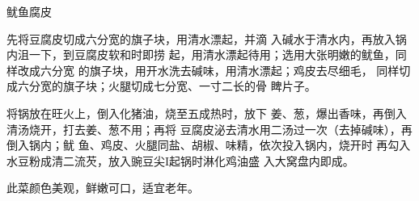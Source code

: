 \begin{recipe}{鱿鱼腐皮}

\ingredients



\cooking

\step 先将豆腐皮切成六分宽的旗子块，用清水漂起，并滴 入碱水于清水内，再放入锅内沮一下，到豆腐皮软和时即捞 起，用清水漂起待用；选用大张明嫩的鱿鱼，同样改成六分宽 的旗子块，用开水洗去碱味，用清水漂起；鸡皮去尽细毛， 同样切成六分宽的旗子块；火腿切成七分宽、一寸二长的骨 睥片子。

\step 将锅放在旺火上，倒入化猪油，烧至五成热时，放下 姜、葱，爆出香味，再倒入清汤烧开，打去姜、葱不用；再将 豆腐皮泌去清水用二汤过一次（去掉碱味），再倒入锅内；鱿 鱼、鸡皮、火腿同盐、胡椒、味精，依次投入锅内，烧开时 再勾入水豆粉成清二流芡，放入豌豆尖I起锅时淋化鸡油盛 入大窝盘内即成。

\notes

此菜颜色美观，鲜嫩可口，适宜老年。

\end{recipe}

